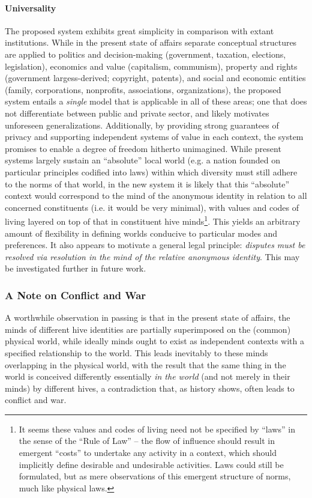 \documentclass[pra,twocolumn,groupedaddress,10pt]{revtex4}
\theoremstyle{definition}
\begin{document}
\paragraph{Universality} The proposed system exhibits great simplicity in comparison with extant institutions. While in the present state of affairs separate conceptual structures are applied to politics and decision-making (government, taxation, elections, legislation), economics and value (capitalism, communism), property and rights (government largess-derived; copyright, patents), and social and economic entities (family, corporations, nonprofits, associations, organizations), the proposed system entails a \textit{single} model that is applicable in all of these areas; one that does not differentiate between public and private sector, and likely motivates unforeseen generalizations. Additionally, by providing strong guarantees of privacy and supporting independent systems of value in each context, the system promises to enable a degree of freedom hitherto unimagined. While present systems largely sustain an ``absolute'' local world (e.g. a nation founded on particular principles codified into laws) within which diversity must still adhere to the norms of that world, in the new system it is likely that this ``absolute'' context would correspond to the mind of the anonymous identity in relation to all concerned constituents (i.e. it would be very minimal), with values and codes of living layered on top of that in constituent hive minds\footnote{It seems these values and codes of living need not be specified by ``laws'' in the sense of the ``Rule of Law'' -- the flow of influence should result in emergent ``costs'' to undertake any activity in a context, which should implicitly define desirable and undesirable activities. Laws could still be formulated, but as mere observations of this emergent structure of norms, much like physical laws.}. This yields an arbitrary amount of flexibility in defining worlds conducive to particular modes and preferences. It also appears to motivate a general legal principle: \textit{disputes must be resolved via resolution in the mind of the relative anonymous identity}. This may be investigated further in future work.

\subsubsection{A Note on Conflict and War}

A worthwhile observation in passing is that in the present state of affairs, the minds of different hive identities are partially superimposed on the (common) physical world, while ideally minds ought to exist as independent contexts with a specified relationship to the world. This leads inevitably to these minds overlapping in the physical world, with the result that the same thing in the world is conceived differently essentially \textit{in the world} (and not merely in their minds) by different hives, a contradiction that, as history shows, often leads to conflict and war.
\end{document}
